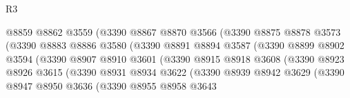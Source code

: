 \begin{lexlean}{R3}
\begin{coremodule}
                                  @8859
                                  @8862
                                  @3559
                                  (@3390
                                    @8867
                                    @8870
                                    @3566
                                    (@3390
                                      @8875
                                      @8878
                                      @3573
                                      (@3390
                                        @8883
                                        @8886
                                        @3580
                                        (@3390
                                          @8891
                                          @8894
                                          @3587
                                          (@3390
                                            @8899
                                            @8902
                                            @3594
                                            (@3390
                                              @8907
                                              @8910
                                              @3601
                                              (@3390
                                                @8915
                                                @8918
                                                @3608
                                                (@3390
                                                  @8923
                                                  @8926
                                                  @3615
                                                  (@3390
                                                    @8931
                                                    @8934
                                                    @3622
                                                    (@3390
                                                      @8939
                                                      @8942
                                                      @3629
                                                      (@3390
                                                        @8947
                                                        @8950
                                                        @3636
                                                        (@3390
                                                          @8955
                                                          @8958
                                                          @3643

\end{coremodule}
\end{lexlean}
